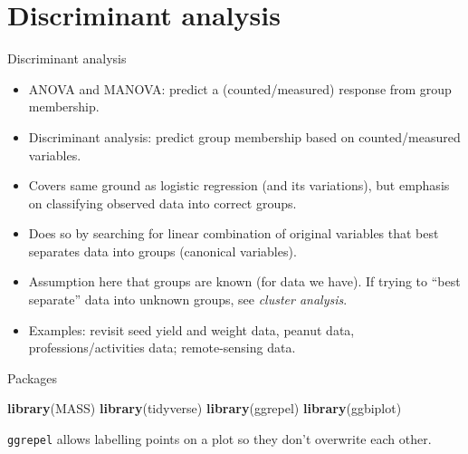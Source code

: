 \documentclass[ignorenonframetext,]{beamer}
\newenvironment{Shaded}{\begin{snugshade}}{\end{snugshade}}
\newcommand{\KeywordTok}[1]{\textcolor[rgb]{0.13,0.29,0.53}{\textbf{#1}}}
\newcommand{\NormalTok}[1]{#1}
\begin{document}
\hypertarget{discriminant-analysis}{%
\section{Discriminant analysis}\label{discriminant-analysis}}

\begin{frame}{Discriminant analysis}
\protect\hypertarget{discriminant-analysis-1}{}

\begin{itemize}
\item
  ANOVA and MANOVA: predict a (counted/measured) response from group
  membership.
\item
  Discriminant analysis: predict group membership based on
  counted/measured variables.
\item
  Covers same ground as logistic regression (and its variations), but
  emphasis on classifying observed data into correct groups.
\item
  Does so by searching for linear combination of original variables that
  best separates data into groups (canonical variables).
\item
  Assumption here that groups are known (for data we have). If trying to
  ``best separate'' data into unknown groups, see \emph{cluster
  analysis}.
\item
  Examples: revisit seed yield and weight data, peanut data,
  professions/activities data; remote-sensing data.
\end{itemize}

\end{frame}

\begin{frame}[fragile]{Packages}
\protect\hypertarget{packages-6}{}

\begin{Shaded}
\begin{Highlighting}[]
\KeywordTok{library}\NormalTok{(MASS)}
\KeywordTok{library}\NormalTok{(tidyverse)}
\KeywordTok{library}\NormalTok{(ggrepel)}
\KeywordTok{library}\NormalTok{(ggbiplot)}
\end{Highlighting}
\end{Shaded}

\texttt{ggrepel} allows labelling points on a plot so they don't
overwrite each other.

\end{frame}
\end{document}
